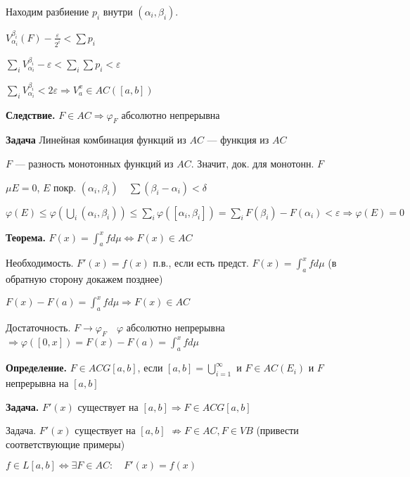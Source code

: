 Находим разбиение $p_i$ внутри $(\alpha_i, \beta_i)$.

$V_{\alpha_i}^{\beta_i} (F) - \frac{\varepsilon}{2^i} < \sum p_i$

$\sum_i V_{\alpha_i}^{\beta_i} - \varepsilon < \sum_i \sum p_i <
\varepsilon$

$\sum_i V_{\alpha_i}^{\beta_i} < 2\varepsilon \Rightarrow V_a^x
\in AC([a,b])$

\textbf{Следствие.} \quad $F \in AC \Rightarrow \varphi_F$
абсолютно непрерывна

\textbf{Задача} \quad Линейная комбинация функций из $AC$ ---
функция из $AC$

$F$ --- разность монотонных функций из $AC$. Значит, док. для
монотонн. $F$

$\mu E = 0$, $E$ покр. $(\alpha_i, \beta_i) \quad \sum(\beta_i -
\alpha_i) < \delta$

$\varphi(E) \leqslant \varphi(\bigcup_i(\alpha_i, \beta_i))
\leqslant \sum_i \varphi([\alpha_i, \beta_i]) = \sum_i F(\beta_i)
- F(\alpha_i) < \varepsilon \Rightarrow \varphi(E) = 0$

\textbf{Теорема.} \quad $F(x) = \int_a^x f d \mu \Leftrightarrow
F(x) \in AC$

Необходимость.  $F'(x) = f(x)$ п.в., если есть предст.  $F(x) =
\int_a^x f d \mu$ (в обратную сторону докажем позднее)

$F(x) - F(a) = \int_a^x f d \mu \Rightarrow F(x) \in AC$

Достаточность. $F \rightarrow \varphi_F \quad \varphi$ абсолютно
непрерывна $\Rightarrow \varphi([0, x]) = F(x) - F(a) = \int_a^x f
d \mu$

\textbf{Определение.} \quad $F \in ACG[a, b]$, если $[a, b] =
\bigcup_{i=1}^\infty$ и $F \in AC(E_i)$ и $F$ непрерывна на
$[a,b]$

\textbf{Задача.} \quad $F'(x)$ существует на $[a, b] \Rightarrow F
\in ACG[a,b]$


%
%
%
%
%
%
%
%
%
%
%
%

Задача. $F'(x)$ существует на $[a,b]$ $\not \Rightarrow F \in AC,
F \in VB$ (привести соответствующие примеры)

$f \in L[a,b] \Leftrightarrow \exists F \in AC: \quad F'(x) =
f(x)$

